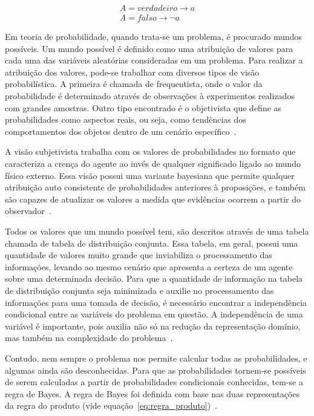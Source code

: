 \begin{subequations}
    \label{eq:neg_valor}
    \begin{align}
        A = verdadeiro \rightarrow a\\
        A = falso \rightarrow \neg a
    \end{align}
\end{subequations}

Em teoria de probabilidade, quando trata-se um problema, é procurado mundos possíveis. Um mundo possível é definido como uma atribuição de valores para cada uma das variáveis aleatórias consideradas em um problema. Para realizar a atribuição dos valores, pode-se trabalhar com diversos tipos de visão probabilística. A primeira é chamada de frequentista, onde o valor da probabilidade é determinado através de observações à experimentos realizados com grandes amostras. Outro tipo encontrado é o objetivista que define as probabilidades como aspectos reais, ou seja, como tendências dos comportamentos dos objetos dentro de um cenário específico~\cite{Russell:2002}.

A visão subjetivista trabalha com os valores de probabilidades no formato que caracteriza a crença do agente ao invés de qualquer significado ligado ao mundo físico externo. Essa visão possui uma variante bayesiana que permite qualquer atribuição auto consistente de probabilidades anteriores à proposições, e também são capazes de atualizar os valores a medida que evidências ocorrem a partir do observador~\cite{Russell:2002}.

Todos os valores que um mundo possível tem, são descritos através de uma tabela chamada de tabela de distribuição conjunta. Essa tabela, em geral, possui uma quantidade de valores muito grande que inviabiliza o processamento das informações, levando ao mesmo cenário que apresenta a certeza de um agente sobre uma determinada decisão. Para que a quantidade de informação na tabela de distribuição conjunta seja minimizada e auxilie no processamento das informações para uma tomada de decisão, é necessário encontrar a independência condicional entre as variáveis do problema em questão. A independência de uma variável é importante, pois auxilia não só na redução da representação domínio, mas também na complexidade do problema~\cite{Russell:2002}.

Contudo, nem sempre o problema nos permite calcular todas as probabilidades, e algumas ainda são desconhecidas. Para que as probabilidades tornem-se possíveis de serem calculadas a partir de probabilidades condicionais conhecidas, tem-se a regra de Bayes. A regra de Bayes foi definida com base nas duas representações da regra do produto (vide equação~\ref{eq:regra_produto})~\cite{Russell:2002}.

